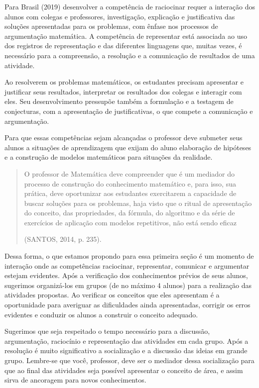 \begin{paginatexto}
Para Brasil (2019) desenvolver a competência de raciocinar requer a interação dos alunos com colegas e professores, investigação, explicação e justificativa das soluções apresentadas para os problemas, com ênfase nos processos de argumentação matemática. A competência de representar está associada ao uso dos registros de representação e das diferentes linguagens que, muitas vezes, é necessário para a compreensão, a resolução e a comunicação de resultados de uma atividade. 

Ao resolverem os problemas matemáticos, os estudantes precisam apresentar e justificar seus resultados, interpretar os resultados dos colegas e interagir com eles. Seu desenvolvimento pressupõe também a formulação e a testagem de conjecturas, com a apresentação de justificativas, o que compete a comunicação e argumentação.

Para que essas competências sejam alcançadas o professor deve submeter seus alunos a situações de aprendizagem que exijam do aluno elaboração de hipóteses e a construção de modelos matemáticos para situações da realidade.

\begin{quote}
O professor de Matemática deve compreender que é um mediador do processo de construção do conhecimento matemático e, para isso, sua prática, deve oportunizar aos estudantes exercitarem a capacidade de buscar soluções para os problemas, haja visto que o ritual de apresentação do conceito, das propriedades, da fórmula, do algoritmo e da série de exercícios de aplicação com modelos repetitivos, não está sendo eficaz 

\flushright
(SANTOS, 2014, p. 235).
\end{quote}

Dessa forma, o que estamos propondo para essa primeira seção é um momento de interação onde as competências raciocinar, representar, comunicar e argumentar estejam evidentes. Após a verificação dos conhecimentos prévios de seus alunos, sugerimos organizá-los em grupos (de no máximo 4 alunos) para a realização das atividades propostas.  Ao verificar os conceitos que eles apresentam é a oportunidade para averiguar as dificuldades ainda apresentadas, corrigir os erros evidentes e conduzir os alunos a construir o conceito adequado.

Sugerimos que seja respeitado o tempo necessário para a discussão, argumentação, raciocínio e representação das atividades em cada grupo. Após a resolução é muito significativo a socialização e a discussão das ideias em grande grupo. Lembre-se que você, professor, deve ser o mediador dessa socialização para que ao final das atividades seja possível apresentar o conceito de área, e assim sirva de ancoragem para novos conhecimentos.


\end{paginatexto}
